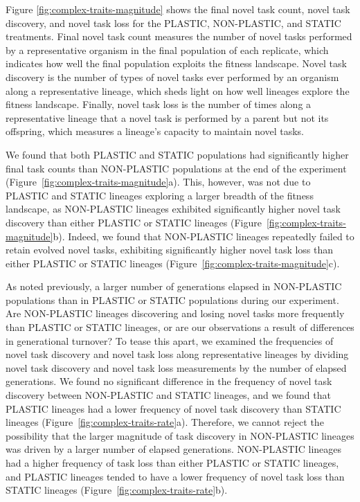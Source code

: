 Figure \ref{fig:complex-traits-magnitude} shows the final novel task count, novel task discovery, and novel task loss for the PLASTIC, NON-PLASTIC, and STATIC treatments.
Final novel task count measures the number of novel tasks performed by a representative organism in the final population of each replicate, which indicates how well the final population exploits the fitness landscape.
Novel task discovery is the number of types of novel tasks ever performed by an organism along a representative lineage, which sheds light on how well lineages explore the fitness landscape. 
Finally, novel task loss is the number of times along a representative lineage that a novel task is performed by a parent but not its offspring, which measures a lineage's capacity to maintain novel tasks. 

We found that both PLASTIC and STATIC populations had significantly higher final task counts than NON-PLASTIC populations at the end of the experiment (Figure~\ref{fig:complex-traits-magnitude}a).
This, however, was not due to PLASTIC and STATIC lineages exploring a larger breadth of the fitness landscape, as NON-PLASTIC lineages exhibited significantly higher novel task discovery than either PLASTIC or STATIC lineages (Figure~\ref{fig:complex-traits-magnitude}b).
Indeed, we found that NON-PLASTIC lineages repeatedly failed to retain evolved novel tasks, exhibiting significantly higher novel task loss than either PLASTIC or STATIC lineages (Figure~\ref{fig:complex-traits-magnitude}c).



As noted previously, a larger number of generations elapsed in NON-PLASTIC populations than in PLASTIC or STATIC populations during our experiment.
Are NON-PLASTIC lineages discovering and losing novel tasks more frequently than PLASTIC or STATIC lineages, or are our observations a result of differences in generational turnover?
To tease this apart, we examined the frequencies of novel task discovery and novel task loss along representative lineages by dividing novel task discovery and novel task loss measurements by the number of elapsed generations.
We found no significant difference in the frequency of novel task discovery between NON-PLASTIC and STATIC lineages, and we found that PLASTIC lineages had a lower frequency of novel task discovery than STATIC lineages (Figure~\ref{fig:complex-traits-rate}a).
Therefore, we cannot reject the possibility that the larger magnitude of task discovery in NON-PLASTIC lineages was driven by a larger number of elapsed generations.
NON-PLASTIC lineages had a higher frequency of task loss than either PLASTIC or STATIC lineages, and PLASTIC lineages tended to have a lower frequency of novel task loss than STATIC lineages (Figure~\ref{fig:complex-traits-rate}b). 

